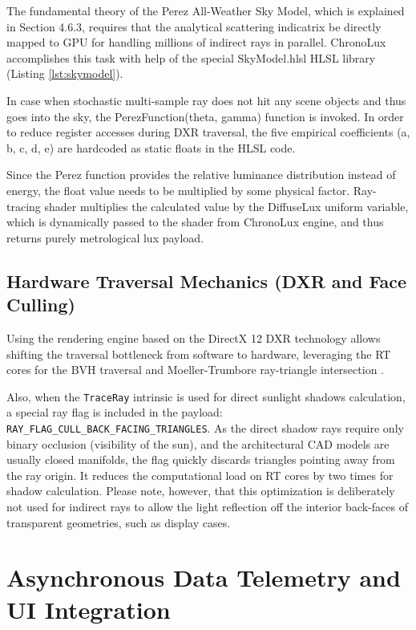 The fundamental theory of the Perez All-Weather Sky Model, which is explained in Section 4.6.3, requires that the analytical scattering indicatrix be directly mapped to GPU for handling millions of indirect rays in parallel. ChronoLux accomplishes this task with help of the special SkyModel.hlsl HLSL library (Listing \ref{lst:skymodel}).

In case when stochastic multi-sample ray does not hit any scene objects and thus goes into the sky, the PerezFunction(theta, gamma) function is invoked. In order to reduce register accesses during DXR traversal, the five empirical coefficients (a, b, c, d, e) are hardcoded as static floats in the HLSL code.

Since the Perez function provides the relative luminance distribution instead of energy, the float value needs to be multiplied by some physical factor. Ray-tracing shader multiplies the calculated value by the DiffuseLux uniform variable, which is dynamically passed to the shader from ChronoLux engine, and thus returns purely metrological lux payload.

\subsection{Hardware Traversal Mechanics (DXR and Face Culling)}

Using the rendering engine based on the DirectX 12 DXR technology allows shifting the traversal bottleneck from software to hardware, leveraging the RT cores for the BVH traversal and Moeller-Trumbore ray-triangle intersection \cite{burgess2020rtx}.

Also, when the \texttt{TraceRay} intrinsic is used for direct sunlight shadows calculation, a special ray flag is included in the payload: \texttt{RAY\_FLAG\_CULL\_BACK\_FACING\_TRIANGLES}. As the direct shadow rays require only binary occlusion (visibility of the sun), and the architectural CAD models are usually closed manifolds, the flag quickly discards triangles pointing away from the ray origin. It reduces the computational load on RT cores by two times for shadow calculation. Please note, however, that this optimization is deliberately not used for indirect rays to allow the light reflection off the interior back-faces of transparent geometries, such as display cases.

\section{Asynchronous Data Telemetry and UI Integration}

